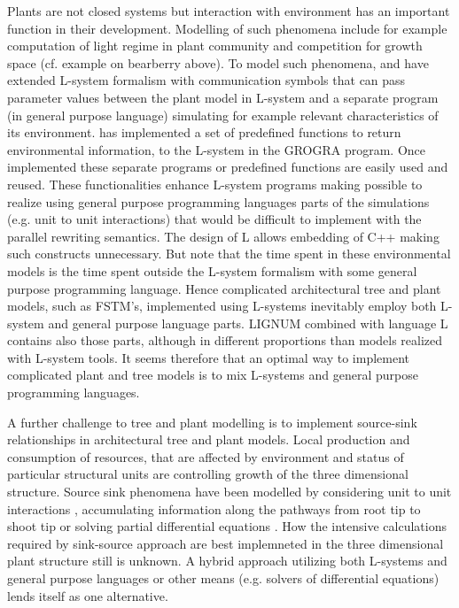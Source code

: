 Plants are not closed systems  but interaction with environment has an
important function in their  development.  Modelling of such phenomena
include for example computation of light regime in plant community and
competition  for growth  space (cf.  example on  bearberry  above). To
model  such   phenomena,  \citet{mech:97}  and   \citet{mech:96}  have
extended L-system  formalism with communication symbols  that can pass
parameter values  between the plant  model in L-system and  a separate
program (in general purpose  language) simulating for example relevant
characteristics of its  environment.  \citet{kurth:94} has implemented
a set of predefined  functions to return environmental information, to
the L-system  in the GROGRA program.  Once  implemented these separate
programs  or predefined functions  are easily  used and  reused. These
functionalities enhance  L-system programs making  possible to realize
using general  purpose programming languages parts  of the simulations
(e.g.  unit to unit interactions) that would be difficult to implement
with  the  parallel  rewriting  semantics.   The design  of  L  allows
embedding of  C++ making such  constructs unnecessary.  But  note that
the  time spent in these  environmental models  is the  time spent
outside the  L-system formalism with some  general purpose programming
language.  Hence complicated architectural tree and plant models, such
as FSTM's, implemented using L-systems inevitably employ both L-system
and general  purpose language parts.  LIGNUM combined  with language L
contains  also those  parts,  although in  different proportions  than
models  realized with  L-system  tools.  It  seems  therefore that  an
optimal way to  implement complicated plant and tree  models is to mix
L-systems and general purpose programming languages.
 
A  further challenge  to  tree  and plant  modelling  is to  implement
source-sink   relationships   in    architectural   tree   and   plant
models.  Local  production  and  consumption of  resources,  that  are
affected by environment and  status of particular structural units are
controlling growth of the  three dimensional structure. Source sink
phenomena have been modelled by considering unit to unit interactions
\citep{balandier:00},  accumulating  information along  the  pathways
from  root tip  to shoot  tip \citep{dereffye:97}  or  solving partial
differential  equations  \citep{deleuze:97,  palovaara:03}.   How  the
intensive  calculations  required  by  sink-source approach  are  best
implemneted  in  the  three   dimensional  plant  structure  still  is
unknown.  A  hybrid  approach  utilizing both  L-systems  and  general
purpose  languages  or  other  means  (e.g.  solvers  of  differential
equations) lends itself as one alternative.


